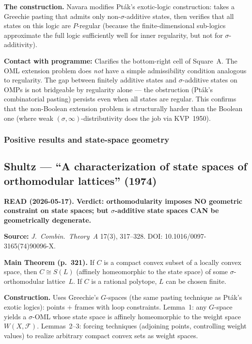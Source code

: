 \medskip\noindent
\textbf{The construction.}  Navara modifies Pt\'{a}k's exotic-logic
construction: takes a Greechie pasting that admits only non-$\sigma$-additive
states, then verifies that all states on this logic are $P$-regular
(because the finite-dimensional sub-logics approximate the full logic
sufficiently well for inner regularity, but not for
$\sigma$-additivity).

\medskip\noindent
\textbf{Contact with programme:} Clarifies the bottom-right cell of
Square~A.  The OML extension problem does \emph{not} have a simple
admissibility condition analogous to regularity.  The gap between
finitely additive states and $\sigma$-additive states on OMPs is
not bridgeable by regularity alone --- the obstruction (Pt\'{a}k's
combinatorial pasting) persists even when all states are regular.
This confirms that the non-Boolean extension problem is
structurally harder than the Boolean one (where weak
$(\sigma,\infty)$-distributivity does the job via KVP~1950).

\subsubsection{Positive results and state-space geometry}

\subsection*{Shultz --- ``A characterization of state spaces of
orthomodular lattices'' (1974)}

\textbf{READ (2026-05-17).  Verdict: orthomodularity imposes NO
geometric constraint on state spaces; but $\sigma$-additive state
spaces CAN be geometrically degenerate.}

\medskip\noindent
\textbf{Source:} \emph{J.\ Combin.\ Theory~A} 17(3), 317--328.
DOI: 10.1016/0097-3165(74)90096-X.

\medskip\noindent
\textbf{Main Theorem (p.~321).}  If $C$ is a compact convex subset
of a locally convex space, then $C \cong S(L)$ (affinely
homeomorphic to the state space) of some $\sigma$-orthomodular
lattice~$L$.  If $C$ is a rational polytope, $L$ can be chosen
finite.

\medskip\noindent
\textbf{Construction.}  Uses Greechie's $G$-spaces (the same
pasting technique as Pt\'{a}k's exotic logics): points $+$ frames
with loop constraints.  Lemma~1: any $G$-space yields a
$\sigma$-OML whose state space is affinely homeomorphic to the
weight space $W(X, \mathscr{F})$.  Lemmas~2--3: forcing techniques
(adjoining points, controlling weight values) to realize arbitrary
compact convex sets as weight spaces.

